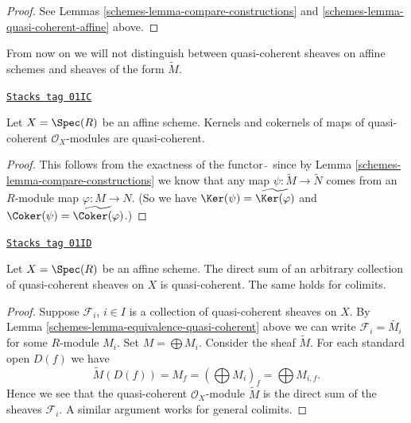 \begin{proof}

See Lemmas \ref{schemes-lemma-compare-constructions}
and \ref{schemes-lemma-quasi-coherent-affine} above.
\end{proof}

From now on we will not distinguish between quasi-coherent
sheaves on affine schemes and sheaves of the form $\widetilde M$.

\begin{lemma}
\label{schemes-lemma-kernel-cokernel-quasi-coherent}
\href{https://stacks.math.columbia.edu/tag/01IC}{\texttt{Stacks tag 01IC}}

Let $X = \Spec(R)$ be an affine scheme.
Kernels and cokernels of maps of quasi-coherent
$\mathcal{O}_X$-modules are quasi-coherent.
\end{lemma}

\begin{proof}

This follows from the exactness of the functor $\widetilde{\ }$
since by Lemma \ref{schemes-lemma-compare-constructions} we know that any map
$\psi : \widetilde{M} \to \widetilde{N}$ comes from
an $R$-module map $\varphi : M \to N$. (So we have
$\Ker(\psi) = \widetilde{\Ker(\varphi)}$ and
$\Coker(\psi) = \widetilde{\Coker(\varphi)}$.)
\end{proof}

\begin{lemma}
\label{schemes-lemma-colimit-quasi-coherent}
\href{https://stacks.math.columbia.edu/tag/01ID}{\texttt{Stacks tag 01ID}}

Let $X = \Spec(R)$ be an affine scheme.
The direct sum of an arbitrary collection of quasi-coherent sheaves
on $X$ is quasi-coherent. The same holds for colimits.
\end{lemma}

\begin{proof}

Suppose $\mathcal{F}_i$, $i \in I$ is a collection of quasi-coherent
sheaves on $X$. By Lemma \ref{schemes-lemma-equivalence-quasi-coherent}
above we can write $\mathcal{F}_i = \widetilde{M_i}$ for some $R$-module
$M_i$. Set $M = \bigoplus M_i$. Consider the sheaf $\widetilde{M}$.
For each standard open $D(f)$ we have
$$
\widetilde{M}(D(f)) = M_f =
\left(\bigoplus M_i\right)_f =
\bigoplus M_{i, f}.
$$
Hence we see that the quasi-coherent $\mathcal{O}_X$-module
$\widetilde{M}$ is the direct sum of the sheaves $\mathcal{F}_i$.
A similar argument works for general colimits.
\end{proof}

